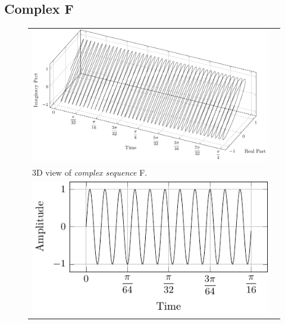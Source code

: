 \documentclass[../../course]{subfiles}
\begin{document}
\subsection{Complex F}

\begin{figure} [H]

    \renewcommand{\arraystretch}{0.75}
    \centering
    \begin{NiceTabularX} {\textwidth} {
            *{2}{>{\centering\arraybackslash}X}
        }

         {
             {
                \includegraphics[height = \textheight] {tikzpics/plotComplexF.pdf}
            }
        }

        &
        \\

         {
            \vbox{
                 {3D view of \emph{complex sequence} F.}
                \label{plt:cmplxF}
            }
        }

        &
        \\

         {
             {
                \includegraphics[height = \textheight] {tikzpics/plotShortX2.pdf}
            }
        }


\end{NiceTabularX}
\end{figure}
\end{document}
